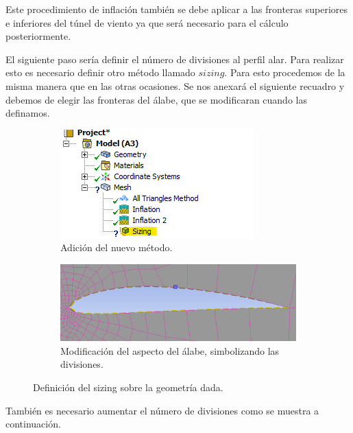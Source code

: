 \documentclass[12pt, letterpaper]{article}
\begin{document}
Este procedimiento de inflación también se debe aplicar a las fronteras superiores e inferiores del túnel de viento ya que será necesario para el cálculo posteriormente.


El siguiente paso sería definir el número de divisiones al perfil alar. Para realizar esto es necesario definir otro método llamado $sizing$. Para esto procedemos de la misma manera que en las otras ocasiones. Se nos anexará el siguiente recuadro y debemos de elegir las fronteras del álabe, que se modificaran cuando las definamos.

\begin{figure}[H]
	\centering
	\begin{subfigure}[b]{0.49\linewidth}
		\includegraphics[width=\linewidth]{12.png}
		\caption{Adición del nuevo método.}
	\end{subfigure}
	\begin{subfigure}[b]{0.49\linewidth}
		\includegraphics[width=\linewidth]{13.png}
		\caption{Modificación del aspecto del álabe, simbolizando las divisiones.}
	\end{subfigure}
	\caption{Definición del sizing sobre la geometría dada.}
\end{figure}

También es necesario aumentar el número de divisiones como se muestra a continuación.
\end{document}
